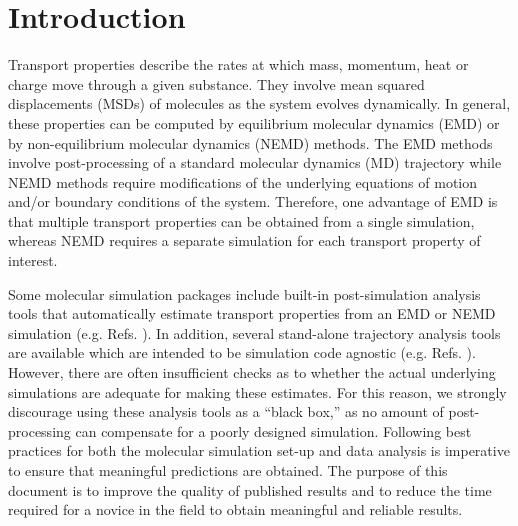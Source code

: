 \documentclass[9pt,bestpractices]{livecoms}
\begin{document}
\section{Introduction}

Transport properties describe the rates at which mass, momentum, heat or charge move through a given substance. They involve mean squared displacements (MSDs) of molecules as the system evolves dynamically. In general, these properties can be computed by equilibrium molecular dynamics (EMD) or by non-equilibrium molecular dynamics (NEMD) methods. The EMD methods involve post-processing of a standard molecular dynamics (MD) trajectory while NEMD methods require modifications of the underlying equations of motion and/or boundary conditions of the system. Therefore, one advantage of EMD is that multiple transport properties can be obtained from a single simulation, whereas NEMD requires a separate simulation for each transport property of interest.

Some molecular simulation packages include built-in post-simulation analysis tools that automatically estimate transport properties from an EMD or NEMD simulation (e.g. Refs. \cite{LAMMPS,GROMACS,AMBER2018,NAMD,Brooks2009}). In addition, several stand-alone trajectory analysis tools are available which are intended to be simulation code agnostic (e.g. Refs. \cite{Roe2013,MDTraj,VMD}). However, there are often insufficient checks as to whether the actual underlying simulations are adequate for making these estimates. For this reason, we strongly discourage using these analysis tools as a ``black box,'' as no amount of post-processing can compensate for a poorly designed simulation. Following best practices for both the molecular simulation set-up and data analysis is imperative to ensure that meaningful predictions are obtained. The purpose of this document is to improve the quality of published results and to reduce the time required for a novice in the field to obtain meaningful and reliable results.
\end{document}
